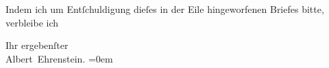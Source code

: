 \pstart
           Indem ich um Entſchuldigung dieſes in der Eile hingeworfenen Briefes bitte, verbleibe
               ich\pend
           
\pstart
           Ihr ergebenſter{\\[\baselineskip]}\spacefill\mbox{Albert Ehrenstein.}\pend
           \leftskip=0em{}\endnumbering{}  \newcommand{\dateiname}{L01852}\newcommand{\titel}{Albert Ehrenstein an Arthur Schnitzler, 1. 7. 1909}\newcommand{\editorInnen}{Martin Anton Müller und Gerd-Hermann Susen}
